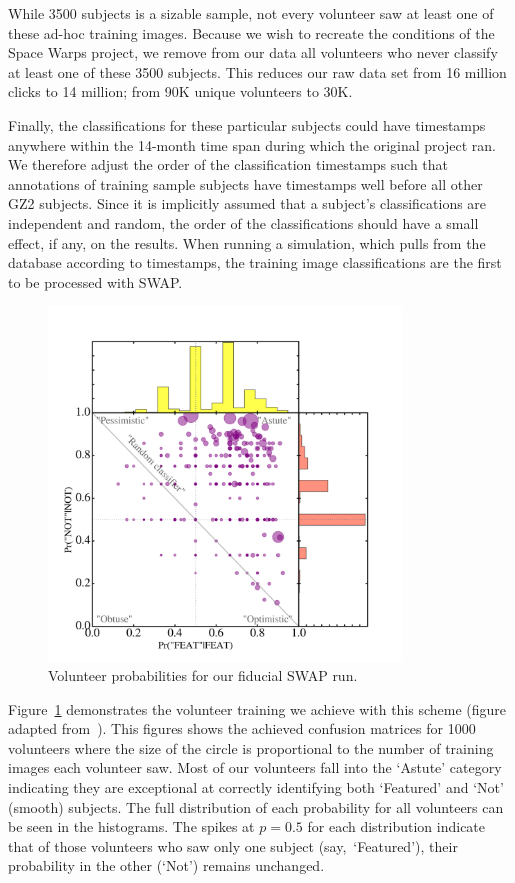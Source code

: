 \documentclass[twocolumn]{aastex6}
\newcommand{\feat}{`Featured'}
\newcommand{\notfeat}{`Not'}
\begin{document}
While 3500 subjects is a sizable sample, not  every volunteer saw at least 
one of these ad-hoc training images. Because we wish to recreate the conditions 
of the Space Warps project, we remove from our data all volunteers who never 
classify at least one of these 3500 subjects. This reduces our raw data set from
16 million clicks to 14 million; from 90K unique volunteers to 30K. 

Finally, the classifications for these particular subjects could 
have timestamps anywhere within the 14-month time span during which the original project ran.
We therefore adjust the order of the classification timestamps such that 
annotations of training sample subjects
have timestamps well before all other GZ2 subjects. Since it is implicitly assumed
that a subject's classifications are independent and random, the order of the 
classifications should have a small effect, if any, on the results.  
When running a simulation, which pulls from the database according to timestamps,
the training image classifications are the first to be processed with SWAP.  


\begin{figure}[t!]
\includegraphics[width=3.7in]{figures/test_user_probs.png}
\caption{Volunteer probabilities for our fiducial SWAP run.  \label{fig: volunteer training}}
\end{figure}

Figure~\ref{fig: volunteer training} demonstrates the volunteer training we achieve
with this scheme (figure adapted from~\cite{Marshall2016}). 
This figures shows the achieved confusion matrices for 1000 volunteers
where the size of the circle is proportional to the number of training images each
volunteer saw. Most of our volunteers fall into the `Astute' category indicating
they are exceptional at correctly identifying both `Featured' and `Not' (smooth) subjects. 
The full distribution of each probability for all volunteers can be seen in the 
histograms. The spikes at $p=0.5$ for each distribution indicate that of those
volunteers who saw only one subject (say,~\feat), their probability in the 
other (\notfeat) remains unchanged.
\end{document}
